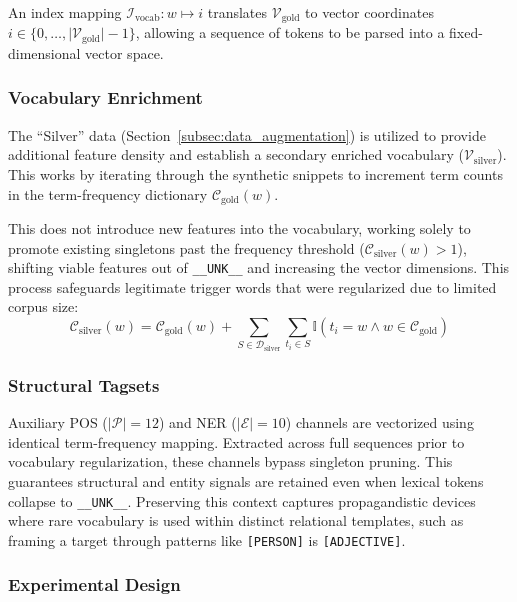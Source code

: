 \documentclass[12pt, a4paper]{article}
\begin{document}
An index mapping $\mathcal{I}_{\text{vocab}}: w \mapsto i$ translates $\mathcal{V}_{\text{gold}}$ to vector coordinates $i \in \{0, \dots, \vert \mathcal{V}_{\text{gold}} \vert - 1\}$, allowing a sequence of tokens to be parsed into a fixed-dimensional vector space.

\subsubsection{Vocabulary Enrichment}
\label{subsubsec:vocab_enrichment}

The ``Silver'' data (Section~\ref{subsec:data_augmentation}) is utilized to provide additional feature density and establish a secondary enriched vocabulary ($\mathcal{V}_{\text{silver}}$). This works by iterating through the synthetic snippets to increment term counts in the term-frequency dictionary $\mathcal{C}_{\text{gold}}(w)$.

This does not introduce new features into the vocabulary, working solely to promote existing singletons past the frequency threshold ($\mathcal{C}_{\text{silver}}(w) > 1$), shifting viable features out of \texttt{\_\_UNK\_\_} and increasing the vector dimensions. This process safeguards legitimate trigger words that were regularized due to limited corpus size:
\[
\mathcal{C}_{\text{silver}}(w) = \mathcal{C}_{\text{gold}}(w) + \sum_{S \in \mathcal{D}_{\text{silver}}} \sum_{t_i \in S} \mathbb{I}(t_i = w \land w \in \mathcal{C}_{\text{gold}})
\]

\subsubsection{Structural Tagsets}
\label{subsubsec:structural_tagsets}

Auxiliary POS ($\vert \mathcal{P} \vert = 12$) and NER ($\vert \mathcal{E} \vert = 10$) channels are vectorized using identical term-frequency mapping. Extracted across full sequences prior to vocabulary regularization, these channels bypass singleton pruning. This guarantees structural and entity signals are retained even when lexical tokens collapse to \texttt{\_\_UNK\_\_}. Preserving this context captures propagandistic devices where rare vocabulary is used within distinct relational templates, such as framing a target through patterns like \texttt{[PERSON]} is \texttt{[ADJECTIVE]}.

\subsubsection{Experimental Design}
\label{subsubsec:experimental_design}
\end{document}
